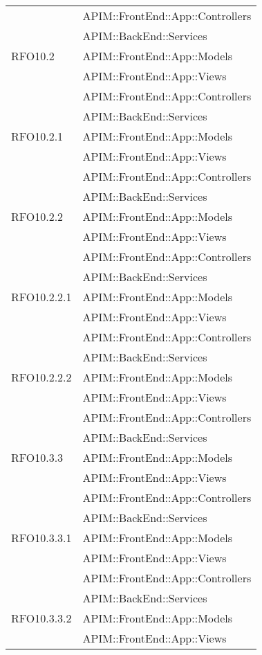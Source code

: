 \begin{longtable}{ p{4cm} | p{12cm} }
			& APIM::FrontEnd::App::Controllers \\
			& APIM::BackEnd::Services \\
			\hline	
			RFO10.2
			& APIM::FrontEnd::App::Models \\
			& APIM::FrontEnd::App::Views \\
			& APIM::FrontEnd::App::Controllers \\
			& APIM::BackEnd::Services \\
			\hline	
			RFO10.2.1
			& APIM::FrontEnd::App::Models \\
			& APIM::FrontEnd::App::Views \\
			& APIM::FrontEnd::App::Controllers \\
			& APIM::BackEnd::Services \\
			\hline	
			RFO10.2.2
			& APIM::FrontEnd::App::Models \\
			& APIM::FrontEnd::App::Views \\
			& APIM::FrontEnd::App::Controllers \\
			& APIM::BackEnd::Services \\
			\hline	
			RFO10.2.2.1
			& APIM::FrontEnd::App::Models \\
			& APIM::FrontEnd::App::Views \\
			& APIM::FrontEnd::App::Controllers \\
			& APIM::BackEnd::Services \\
			\hline	
			RFO10.2.2.2
			& APIM::FrontEnd::App::Models \\
			& APIM::FrontEnd::App::Views \\
			& APIM::FrontEnd::App::Controllers \\
			& APIM::BackEnd::Services \\
			\hline	
			RFO10.3.3
			& APIM::FrontEnd::App::Models \\
			& APIM::FrontEnd::App::Views \\
			& APIM::FrontEnd::App::Controllers \\
			& APIM::BackEnd::Services \\
			\hline	
			RFO10.3.3.1
			& APIM::FrontEnd::App::Models \\
			& APIM::FrontEnd::App::Views \\
			& APIM::FrontEnd::App::Controllers \\
			& APIM::BackEnd::Services \\
			\hline	
			RFO10.3.3.2
			& APIM::FrontEnd::App::Models \\
			& APIM::FrontEnd::App::Views \\

\end{longtable}
